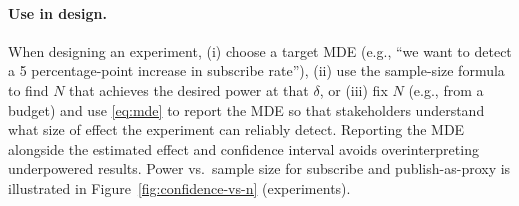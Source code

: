 \paragraph{Use in design.}
When designing an experiment, (i) choose a target MDE (e.g., ``we want to detect a 5 percentage-point increase in subscribe rate''), (ii) use the sample-size formula to find $N$ that achieves the desired power at that $\delta$, or (iii) fix $N$ (e.g., from a budget) and use \eqref{eq:mde} to report the MDE so that stakeholders understand what size of effect the experiment can reliably detect. Reporting the MDE alongside the estimated effect and confidence interval avoids overinterpreting underpowered results. Power vs.\ sample size for subscribe and publish-as-proxy is illustrated in Figure~\ref{fig:confidence-vs-n} (experiments).
